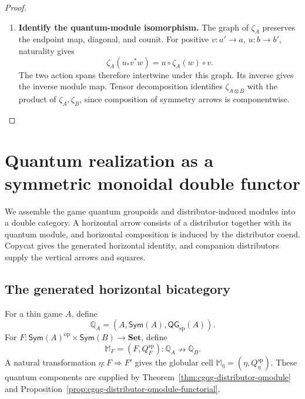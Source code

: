 \documentclass[oneside]{article}
\newcommand{\Sym}{\mathsf{Sym}}
\newcommand{\QG}{\mathsf{QG}}
\newcommand{\op}{\mathrm{op}}
\newcommand{\xnrightarrow}[1]{\mathrel{\overset{#1}{\nrightarrow}}}
\theoremstyle{plain}
\theoremstyle{definition}
\theoremstyle{remark}
\begin{document}
\begin{proof}
\begin{enumerate}[beginpenalty=10000]
        \item \textbf{Identify the quantum-module isomorphism.}
        The graph of \(\zeta_A\) preserves the endpoint map, diagonal,
        and counit. For positive \(v:a'\to a\), \(u:b\to b'\),
        naturality gives
        \[
        \zeta_A(u_*v^*w)=u\circ\zeta_A(w)\circ v.
        \]
        The two action spans therefore intertwine under this graph.
        Its inverse gives the inverse module map. Tensor decomposition
        identifies \(\zeta_{A\otimes B}\) with the product of
        \(\zeta_A,\zeta_B\), since composition of symmetry arrows is
        componentwise. \qedhere
    \end{enumerate}
\end{proof}

\section{Quantum realization as a symmetric monoidal double functor}
\label{sec:cgqg-composition-scope}

We assemble the game quantum groupoids and distributor-induced modules into
a double category. A horizontal arrow consists of a distributor together
with its quantum module, and horizontal composition is induced by the
distributor coend. Copycat gives the generated horizontal identity, and companion
distributors supply the vertical arrows and squares.

\subsection{The generated horizontal bicategory}
\label{subsec:cgqg-generated-qmodule-bicategory}

For a thin game \(A\), define
\begin{equation}
 \mathbb Q_A=(A,\Sym(A),\QG_{\mathrm{sp}}(A)).
 \label{eq:cgqg-generated-quantum-object}
\end{equation}
For \(F:\Sym(A)^\op\times \Sym(B)\to\mathbf{Set}\), define
\begin{equation}
 \mathbb M_F=(F,Q_F^{\mathrm{sp}}):
 \mathbb Q_A\xnrightarrow{}\mathbb Q_B.
 \label{eq:cgqg-generated-horizontal-arrow-pair}
\end{equation}
A natural transformation \(\eta:F\Rightarrow F'\) gives the globular cell
\(\mathbb M_\eta=(\eta,Q_\eta^{\mathrm{sp}})\).
These quantum components are supplied by
Theorem~\ref{thm:cgqg-distributor-qmodule} and
Proposition~\ref{prop:cgqg-distributor-qmodule-functorial}.
\end{document}
